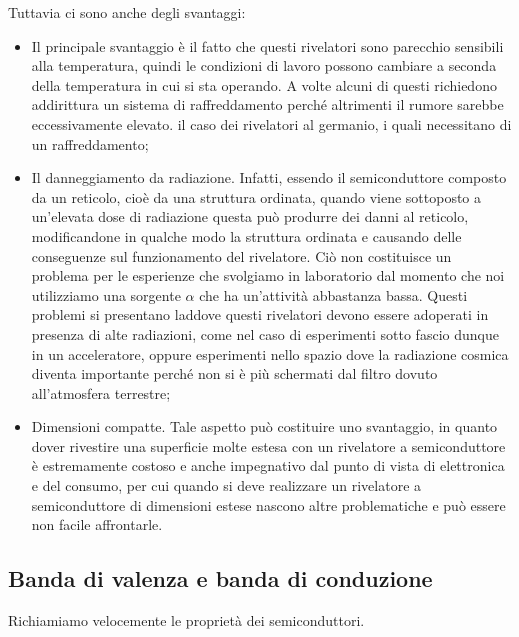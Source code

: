 Tuttavia ci sono anche degli svantaggi:
\begin{itemize}[leftmargin=0.5cm]
   \item Il principale svantaggio è il fatto che questi rivelatori sono parecchio sensibili alla temperatura, quindi le condizioni di lavoro possono cambiare a seconda della temperatura in cui si sta operando. A volte alcuni di questi richiedono addirittura un sistema di raffreddamento perché altrimenti il rumore sarebbe eccessivamente elevato. \E il caso dei rivelatori al germanio, i quali necessitano di un raffreddamento;
   \item Il danneggiamento da radiazione. Infatti, essendo il semiconduttore composto da un reticolo, cioè da una struttura ordinata, quando viene sottoposto a un'elevata dose di radiazione questa può produrre dei danni al reticolo, modificandone in qualche modo la struttura ordinata e causando delle conseguenze sul funzionamento del rivelatore. Ciò non costituisce un problema per le esperienze che svolgiamo in laboratorio dal momento che noi utilizziamo una sorgente $\alpha$ che ha un'attività abbastanza bassa. Questi problemi si presentano laddove questi rivelatori devono essere adoperati in presenza di alte radiazioni, come nel caso di esperimenti sotto fascio dunque in un acceleratore, oppure esperimenti nello spazio dove la radiazione cosmica diventa importante perché non si è più schermati dal filtro dovuto all'atmosfera terrestre;
   \item Dimensioni compatte. Tale aspetto può costituire uno svantaggio, in quanto dover rivestire una superficie molte estesa con un rivelatore a semiconduttore è estremamente costoso e anche impegnativo dal punto di vista di elettronica e del consumo, per cui quando si deve realizzare un rivelatore a semiconduttore di dimensioni estese nascono altre problematiche e può essere non facile affrontarle.
\end{itemize}

\subsection{Banda di valenza e banda di conduzione}
Richiamiamo velocemente le proprietà dei semiconduttori.

